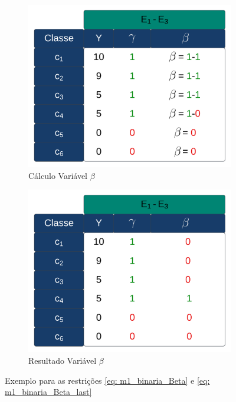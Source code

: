 \begin{figure}[H]
	\centering
	\begin{subfigure}[b]{0.35\linewidth}
		\includegraphics[width=\linewidth]{img/BL_1.png}
		\caption{Cálculo Variável $\beta$}
		\label{fig:Beta_1}
	\end{subfigure}\hspace{5mm}
	\begin{subfigure}[b]{0.35\linewidth}
		\includegraphics[width=\linewidth]{img/BL_2.png}
		\caption{Resultado Variável $\beta$}
		\label{fig:Beta_2}
	\end{subfigure}
	\caption{Exemplo para as restrições \ref{eq: m1_binaria_Beta} e \ref{eq: m1_binaria_Beta_last}}
	\label{fig:Beta}
\end{figure}

